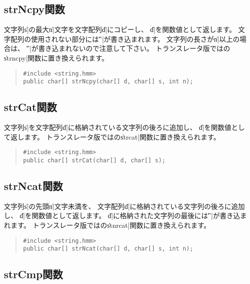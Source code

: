 \subsection{strNcpy関数}

文字列\|s|の最大\|n|文字を文字配列\|d|にコピーし、
\|d|を関数値として返します。
文字配列の使用されない部分には\|'\0'|が書き込まれます。
文字列の長さが\|n|以上の場合は、
\|'\0'|が書き込まれないので注意して下さい。
トランスレータ版では\cl の\|strncpy|関数に置き換えられます。

\begin{quote}
\begin{verbatim}
#include <string.hmm>
public char[] strNcpy(char[] d, char[] s, int n);
\end{verbatim}
\end{quote}

\subsection{strCat関数}

文字列\|s|を文字配列\|d|に格納されている文字列の後ろに追加し、
\|d|を関数値として返します。
トランスレータ版では\cl の\|strcat|関数に置き換えられます。

\begin{quote}
\begin{verbatim}
#include <string.hmm>
public char[] strCat(char[] d, char[] s);
\end{verbatim}
\end{quote}

\subsection{strNcat関数}

文字列\|s|の先頭\|n|文字未満を、
文字配列\|d|に格納されている文字列の後ろに追加し、
\|d|を関数値として返します。
\|d|に格納された文字列の最後には\|'\0'|が書き込まれます。
トランスレータ版では\cl の\|stnrcat|関数に置き換えられます。

\begin{quote}
\begin{verbatim}
#include <string.hmm>
public char[] strNcat(char[] d, char[] s, int n);
\end{verbatim}
\end{quote}

\subsection{strCmp関数}


